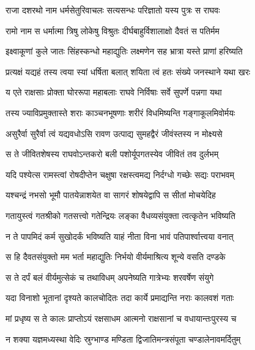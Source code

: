 \twolineshloka
{राजा दशरथो नाम धर्मसेतुरिवाचलः}
{सत्यसन्धः परिज्ञातो यस्य पुत्रः स राघवः} %

\twolineshloka
{रामो नाम स धर्मात्मा त्रिषु लोकेषु विश्रुतः}
{दीर्घबाहुर्विशालाक्षो दैवतं स पतिर्मम} %

\twolineshloka
{इक्ष्वाकूणां कुले जातः सिंहस्कन्धो महाद्युतिः}
{लक्ष्मणेन सह भ्रात्रा यस्ते प्राणां हरिष्यति} %

\twolineshloka
{प्रत्यक्षं यद्यहं तस्य त्वया स्यां धर्षिता बलात्}
{शयिता त्वं हतः संख्ये जनस्थाने यथा खरः} %

\twolineshloka
{य एते राक्षसाः प्रोक्ता घोररूपा महाबलाः}
{राघवे निर्विषाः सर्वे सुपर्णे पन्नगा यथा} %

\twolineshloka
{तस्य ज्याविप्रमुक्तास्ते शराः काञ्चनभूषणाः}
{शरीरं विधमिष्यन्ति गङ्गाकूलमिवोर्मयः} %

\twolineshloka
{असुरैर्वा सुरैर्वा त्वं यद्यवधोऽसि रावण}
{उत्पाद्य सुमहद्वैरं जीवंस्तस्य न मोक्ष्यसे} %

\twolineshloka
{स ते जीवितशेषस्य राघवोऽन्तकरो बली}
{पशोर्यूपगतस्येव जीवितं तव दुर्लभम्} %

\twolineshloka
{यदि पश्येत्स रामस्त्वां रोषदीप्तेन चक्षुषा}
{रक्षस्त्वमद्य निर्दग्धो गच्छेः सद्यः पराभवम्} %

\twolineshloka
{यश्चन्द्रं नभसो भूमौ पातयेन्नाशयेत वा}
{सागरं शोषयेद्वापि स सीतां मोचयेदिह} %

\twolineshloka
{गतायुस्त्वं गतश्रीको गतसत्त्वो गतेन्द्रियः}
{लङ्का वैधव्यसंयुक्ता त्वत्कृतेन भविष्यति} %

\twolineshloka
{न ते पापमिदं कर्म सुखोदर्कं भविष्यति}
{याहं नीता विना भावं पतिपार्श्वात्त्वया वनात्} %

\twolineshloka
{स हि दैवतसंयुक्तो मम भर्ता महाद्युतिः}
{निर्भयो वीर्यमाश्रित्य शून्ये वसति दण्डके} %

\twolineshloka
{स ते दर्पं बलं वीर्यमुत्सेकं च तथाविधम्}
{अपनेष्यति गात्रेभ्यः शरवर्षेण संयुगे} %

\twolineshloka
{यदा विनाशो भूतानां दृश्यते कालचोदितः}
{तदा कार्ये प्रमाद्यन्ति नराः कालवशं गताः} %

\twolineshloka
{मां प्रधृष्य स ते कालः प्राप्तोऽयं रक्षसाधम}
{आत्मनो राक्षसानां च वधायान्तःपुरस्य च} %

\twolineshloka
{न शक्या यज्ञमध्यस्था वेदिः स्रुग्भाण्ड मण्डिता}
{द्विजातिमन्त्रसंपूता चण्डालेनावमर्दितुम्} %

